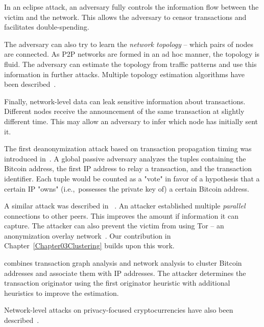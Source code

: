 In an eclipse attack, an adversary fully controls the information flow between the victim and the network.
This allows the adversary to censor transactions and facilitates double-spending.

The adversary can also try to learn the \textit{network topology} -- which pairs of nodes are connected.
As P2P networks are formed in an ad hoc manner, the topology is fluid.
The adversary can estimate the topology from traffic patterns and use this information in further attacks.
Multiple topology estimation algorithms have been described~\cite{Miller2015, Neudecker2016, Wang2017}.

Finally, network-level data can leak sensitive information about transactions.
Different nodes receive the announcement of the same transaction at slightly different time.
This may allow an adversary to infer which node has initially sent it.

The first deanonymization attack based on transaction propagation timing was introduced in~\cite{Koshy2014}.
A global passive adversary analyzes the tuples containing the Bitcoin address, the first IP address to relay a transaction, and the transaction identifier.
Each tuple would be counted as a "vote" in favor of a hypothesis that a certain IP "owns" (i.e.,~possesses the private key of) a certain Bitcoin address.

A similar attack was described in ~\cite{Biryukov2014}.
An attacker established multiple \textit{parallel} connections to other peers.
This improves the amount if information it can capture.
The attacker can also prevent the victim from using Tor -- an anonymization overlay network~\cite{Biryukov2015}.
Our contribution in Chapter~\ref{Chapter03Clustering} builds upon this work.

\cite{Neudecker2017} combines transaction graph analysis and network analysis to cluster Bitcoin addresses and associate them with IP addresses.
The attacker determines the transaction originator using the first originator heuristic with additional heuristics to improve the estimation.

Network-level attacks on privacy-focused cryptocurrencies have also been described~\cite{Quesnelle2017, Biryukov2019d, Bogatyy2019, Tramer2020}.
